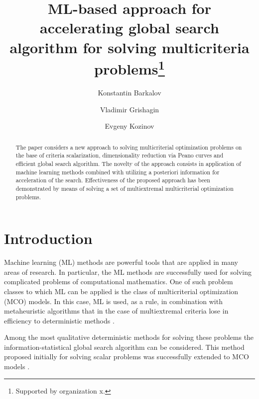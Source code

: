 \documentclass[runningheads]{llncs}
\begin{document}
%
\title{ML-based approach for accelerating global search algorithm for solving multicriteria problems\thanks{Supported by organization x.}}
%
%
\author{Konstantin Barkalov \and
Vladimir Grishagin \and
Evgeny Kozinov}
%
%
%
\maketitle              %
%
\begin{abstract}
The paper considers a new approach to solving multicriterial optimization problems on the base of criteria scalarization, dimensionality reduction via Peano curves and efficient global search algorithm. The novelty of the approach consists in application of machine learning methods combined with utilizing a posteriori information for acceleration of the search. Effectiveness of the proposed approach has been demonstrated by means of solving a set of multiextremal multicriterial optimization problems.

\end{abstract}
%
%
%
\section{Introduction}
\textcolor[rgb]{1,0,0}{Machine learning (ML) methods are powerful tools that are applied in many areas of research.}
In particular, the ML methods are successfully used for solving complicated problems of computational mathematics. One of such problem classes to which ML can be applied is the class of multicriterial optimization (MCO) models. 
In this case, ML is used, as a rule, in combination with metaheuristic algorithms \cite{Subraveti2019} that in the case of multiextremal criteria lose in efficiency to deterministic methods \cite{Kvasov2018,Sergeyev2018}.

Among the most qualitative deterministic methods for solving \textcolor[rgb]{1,0,0}{these problems} the information-statistical global search algorithm \cite{Sergeyev2013,Strongin2000} can be considered. This method proposed initially for solving scalar problems was successfully extended to MCO models \cite{GergelKozinovAPI2016,Gergel2018}.
\end{document}
